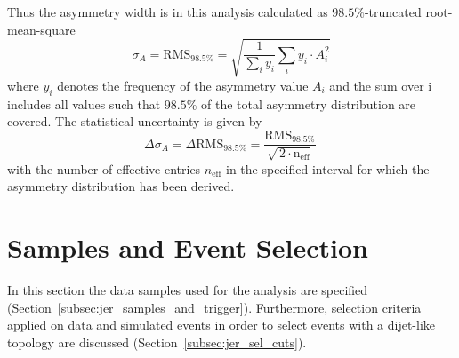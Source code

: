 Thus the asymmetry width is in this analysis calculated as $98.5\%$-truncated root-mean-square
\begin{equation}
 \sigma_A = \mathrm{RMS}_{98.5\%} = \sqrt{\frac{1}{\sum_{i} y_i} \sum_{i} y_i \cdot A_i^2}  
\end{equation} 
where $y_i$ denotes the frequency of the asymmetry value $A_i$ and the sum over i includes all values such that $98.5\%$ of the total asymmetry distribution are covered. The statistical uncertainty is given by
\begin{equation}
\Delta \sigma_A = \Delta \mathrm{RMS}_{98.5\%} = \frac{\mathrm{RMS}_{98.5\%}}{\sqrt{\, 2 \cdot \mathrm{n_\mathrm{eff}}}} \,
\end{equation} 
with the number of effective entries $n_\mathrm{eff}$ in the specified interval for which the asymmetry distribution has been derived. 

\section{Samples and Event Selection}
\label{sec:jer_selection}
In this section the data samples used for the analysis are specified (Section~\ref{subsec:jer_samples_and_trigger}). Furthermore, selection criteria applied on data and simulated events in order to select events with a dijet-like topology are discussed (Section~\ref{subsec:jer_sel_cuts}). 

